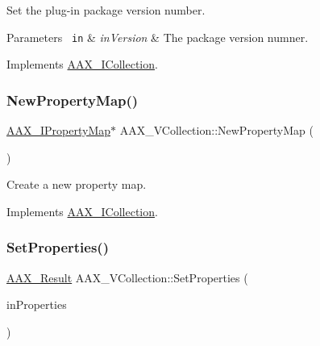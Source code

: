 Set the plug-\/in package version number. 


\begin{DoxyParams}[1]{Parameters}
\mbox{\texttt{ in}}  & {\em in\+Version} & The package version numner. \\
\hline
\end{DoxyParams}


Implements \mbox{\hyperlink{a01777_a4e69ac93eaac9c285c2bc3ac5b25880b}{A\+A\+X\+\_\+\+I\+Collection}}.

\mbox{\label{a01897_a564f2e0d4530e17e135c7b011c9bd3d8}} 
\subsubsection{\texorpdfstring{NewPropertyMap()}{NewPropertyMap()}}
{\footnotesize\ttfamily \mbox{\hyperlink{a01869}{A\+A\+X\+\_\+\+I\+Property\+Map}}$\ast$ A\+A\+X\+\_\+\+V\+Collection\+::\+New\+Property\+Map (\begin{DoxyParamCaption}{ }\end{DoxyParamCaption})\hspace{0.3cm}{\ttfamily [virtual]}}



Create a new property map. 



Implements \mbox{\hyperlink{a01777_a665bac1e4e4558e0998d15a030a57407}{A\+A\+X\+\_\+\+I\+Collection}}.

\mbox{\label{a01897_a08afb5e984bac10864366e0f356ff687}} 
\subsubsection{\texorpdfstring{SetProperties()}{SetProperties()}}
{\footnotesize\ttfamily \mbox{\hyperlink{a00392_a4d8f69a697df7f70c3a8e9b8ee130d2f}{A\+A\+X\+\_\+\+Result}} A\+A\+X\+\_\+\+V\+Collection\+::\+Set\+Properties (\begin{DoxyParamCaption}\item[{\mbox{\hyperlink{a01869}{A\+A\+X\+\_\+\+I\+Property\+Map}} $\ast$}]{in\+Properties }\end{DoxyParamCaption})\hspace{0.3cm}{\ttfamily [virtual]}}



